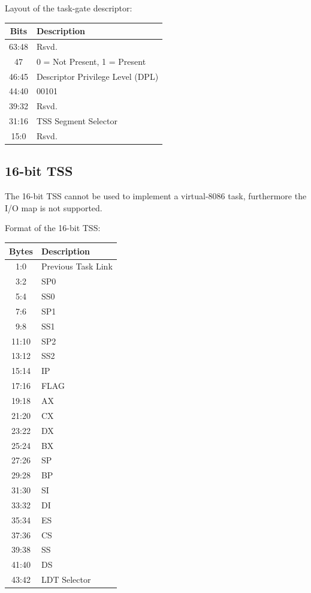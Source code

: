 \documentclass{article}
\newcommand{\layout}[1]{\parbox{\linewidth}{#1}}
\begin{document}
\layout{
  Layout of the task-gate descriptor:
  \begin{table}[H]
    \centering
    \begin{tabular}{|c|l|}
      \hline \textbf{Bits} & \textbf{Description} \\ \hline
      63:48 & Rsvd. \\
      47 & 0 = Not Present, 1 = Present \\
      46:45 & Descriptor Privilege Level (DPL) \\
      44:40 & 00101 \\
      39:32 & Rsvd. \\
      31:16 & TSS Segment Selector \\
      15:0 & Rsvd. \\ \hline
    \end{tabular}
  \end{table}

  \cite[Chapter~9.2.5]{sdm3}
}

\layout{
  \subsection{16-bit TSS}

  The 16-bit TSS cannot be used to implement a virtual-8086 task, furthermore the I/O map is not supported.

  \bigskip

  Format of the 16-bit TSS:
  \begin{table}[H]
    \centering
    \begin{tabular}{|c|l|}
      \hline \textbf{Bytes} & \textbf{Description} \\ \hline
      1:0 & Previous Task Link \\
      3:2 & SP0 \\
      5:4 & SS0 \\
      7:6 & SP1 \\
      9:8 & SS1 \\
      11:10 & SP2 \\
      13:12 & SS2 \\
      15:14 & IP \\
      17:16 & FLAG \\
      19:18 & AX \\
      21:20 & CX \\
      23:22 & DX \\
      25:24 & BX \\
      27:26 & SP \\
      29:28 & BP \\
      31:30 & SI \\
      33:32 & DI \\
      35:34 & ES \\
      37:36 & CS \\
      39:38 & SS \\
      41:40 & DS \\
      43:42 & LDT Selector \\ \hline
    \end{tabular}
  \end{table}

  \cite[Chapter~9.6]{sdm3}
}
\end{document}
